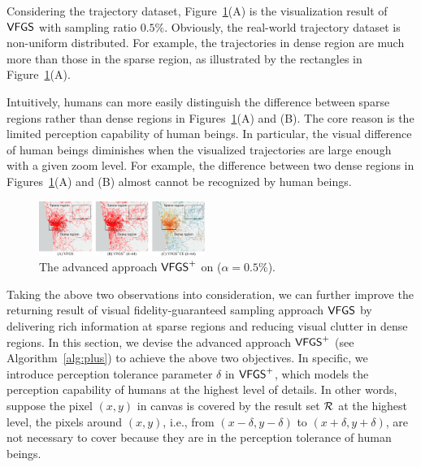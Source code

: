  Considering the \pt{} trajectory dataset, Figure~\ref{fig:delta}(A) is the visualization result of $\mathsf{VFGS}$ with sampling ratio $0.5\%$.
Obviously, the real-world trajectory dataset is non-uniform distributed.
For example, the trajectories in dense region are much more than those in the sparse region, as illustrated by the rectangles in Figure~\ref{fig:delta}(A).

 Intuitively, humans can more easily distinguish the difference between sparse regions rather than dense regions in Figures~\ref{fig:delta}(A) and (B).
The core reason is the limited perception capability of human beings.
In particular, the visual difference of human beings diminishes when the visualized trajectories are large enough with a given zoom level.
For example, the difference between two dense regions in Figures~\ref{fig:delta}(A) and (B) almost cannot be recognized by human beings.


\begin{figure}%
	\centering
	\includegraphics[width=0.48\textwidth]{pictures/problemsolveing/delta_motivation.pdf}
    \vspace{-4mm}
	\caption{The advanced approach $\mathsf{VFGS}^{+}$ on \pt{} ($\alpha = 0.5\%$).} \label{fig:delta}
	 \vspace{-4mm}
\end{figure}


Taking the above two observations into consideration, we can further improve the returning result of visual fidelity-guaranteed sampling approach $\mathsf{VFGS}$ by
delivering rich information at sparse regions and reducing visual clutter in dense regions.
In this section, we devise the advanced approach $\mathsf{VFGS}^{+}$ (see Algorithm~\ref{alg:plus})  to achieve the above two objectives.
In specific, we introduce perception tolerance parameter $\delta$ in $\mathsf{VFGS}^{+}$, which models the perception capability of humans at the highest level of details.
In other words, suppose the pixel $(x,y)$ in canvas is covered by the result set $\mathcal{R}$ at the highest level,
the pixels around $(x,y)$, i.e., from $(x-\delta, y-\delta)$ to $(x+\delta, y+\delta)$, are not necessary to cover because they are in the perception tolerance of human beings.

